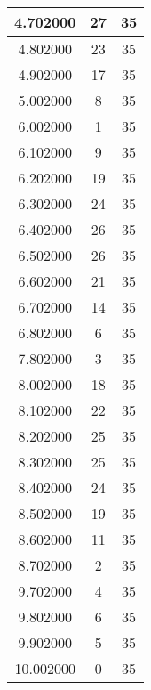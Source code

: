 \begin{longtable}[htbp]{|c|c|c|}
4.702000 & 27 & 35 \\ \hline
4.802000 & 23 & 35 \\ \hline
4.902000 & 17 & 35 \\ \hline
5.002000 & 8 & 35 \\ \hline
6.002000 & 1 & 35 \\ \hline
6.102000 & 9 & 35 \\ \hline
6.202000 & 19 & 35 \\ \hline
6.302000 & 24 & 35 \\ \hline
6.402000 & 26 & 35 \\ \hline
6.502000 & 26 & 35 \\ \hline
6.602000 & 21 & 35 \\ \hline
6.702000 & 14 & 35 \\ \hline
6.802000 & 6 & 35 \\ \hline
7.802000 & 3 & 35 \\ \hline
8.002000 & 18 & 35 \\ \hline
8.102000 & 22 & 35 \\ \hline
8.202000 & 25 & 35 \\ \hline
8.302000 & 25 & 35 \\ \hline
8.402000 & 24 & 35 \\ \hline
8.502000 & 19 & 35 \\ \hline
8.602000 & 11 & 35 \\ \hline
8.702000 & 2 & 35 \\ \hline
9.702000 & 4 & 35 \\ \hline
9.802000 & 6 & 35 \\ \hline
9.902000 & 5 & 35 \\ \hline
10.002000 & 0 & 35 \\ \hline
\end{longtable}
